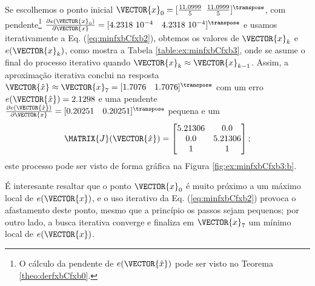 \begin{SolutionT}
\label{ex:minfxbCfxb3:sol1}
Se escolhemos o ponto inicial $\VECTOR{x}_0=[\frac{11.0999}{5}$ $\frac{11.0999}{5}]^{\transpose}$,
com pendente\footnote{O cálculo da
pendente de $e(\VECTOR{\hat{x}})$ pode ser visto no Teorema \ref{theo:derfxbCfxb0}.} 
$\frac{\partial e(\VECTOR{x}_0)}{\partial \VECTOR{x} }=[4.2318~10^{-4}\quad 4.2318~10^{-4}]^{\transpose}$ e 
usamos iterativamente a Eq. (\ref{eq:minfxbCfxb2}), obtemos os valores 
de $\VECTOR{x}_k$ e $e(\VECTOR{x}_k)$, como mostra a Tabela \ref{table:ex:minfxbCfxb3},
onde se asume o final do processo iterativo quando $\VECTOR{x}_k \approx \VECTOR{x}_{k-1}$.
Assim, a aproximação iterativa conclui na resposta $\VECTOR{\hat{x}}\approx \VECTOR{x}_{7} =[1.7076\quad 1.7076]^{\transpose}$
com um erro $e(\VECTOR{\hat{x}})=2.1298$ e uma pendente
$\frac{\partial e(\VECTOR{\hat{x}})}{\partial \VECTOR{x} }=[0.20251\quad 0.20251]^{\transpose}$
pequena e um
\begin{equation}
\MATRIX{J}(\VECTOR{\hat{x}})=
\begin{bmatrix}
5.21306 & 0.0\\ 
0.0     & 5.21306\\
1       & 1
\end{bmatrix};
\end{equation}
este processo pode ser visto de forma gráfica na Figura \ref{fig:ex:minfxbCfxb3:b}.

É interesante resaltar que o ponto $\VECTOR{x}_0$ é muito próximo a um máximo local de 
$e(\VECTOR{x})$, e o uso iterativo da Eq. (\ref{eq:minfxbCfxb2}) 
provoca o afastamento deste ponto, mesmo que a princípio os passos sejam pequenos;
por outro lado, a busca iterativa converge e finaliza em $\VECTOR{x}_7$ um mínimo local 
de $e(\VECTOR{x})$.

\end{SolutionT}


